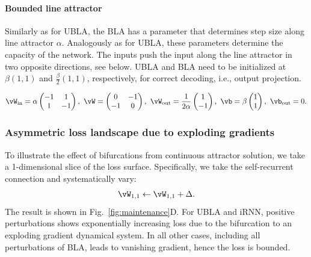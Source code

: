 \documentclass{article} %
\newcounter{ct}
\newcommand{\win}{\vW_{\text{in}}}
\newcommand{\wout}{\vW_{\text{out}}}
\newcommand{\bout}{\vb_{\text{out}}}
\theoremstyle{definition}
\theoremstyle{remark}
\begin{document}
\paragraph{Bounded line attractor}\label{sec:bla}
Similarly as for UBLA, the BLA has a parameter that determines step size along line attractor $\alpha$. Analogously as for UBLA, these parameters determine the capacity of the network.
The inputs push the input along the line attractor in two opposite directions, see below. UBLA and BLA need to be initialized at $\beta(1,1)$ and $\tfrac{\beta}{2}(1,1)$, respectively, for correct decoding, i.e., output projection.

\begin{equation}\label{eq:bla}
\win = \alpha
\begin{pmatrix}
-1  &  1 \\
1  &  -1
\end{pmatrix}, \
\vW = 
\begin{pmatrix}
0  &  -1 \\
-1  &  0
\end{pmatrix}, \
\wout = \frac{1}{2\alpha}
\begin{pmatrix}
1  \\  -1 
\end{pmatrix}, \
\vb = \beta
\begin{pmatrix}
1 \\  1 
\end{pmatrix}, \
\bout = 0.
\end{equation}

\subsubsection{Asymmetric loss landscape due to exploding gradients}
To illustrate the effect of bifurcations from continuous attractor solution, we take a 1-dimensional slice of the loss surface.
Specifically, we take the self-recurrent connection and systematically vary:
\begin{align}
    \vW_{1,1} \leftarrow \vW_{1,1} + \Delta.
\end{align}
The result is shown in Fig.~\ref{fig:maintenance}D.
For UBLA and iRNN, positive perturbations shows exponentially increasing loss due to the bifurcation to an exploding gradient dynamical system.
In all other cases, including all perturbations of BLA, leads to vanishing gradient, hence the loss is bounded.
\end{document}
